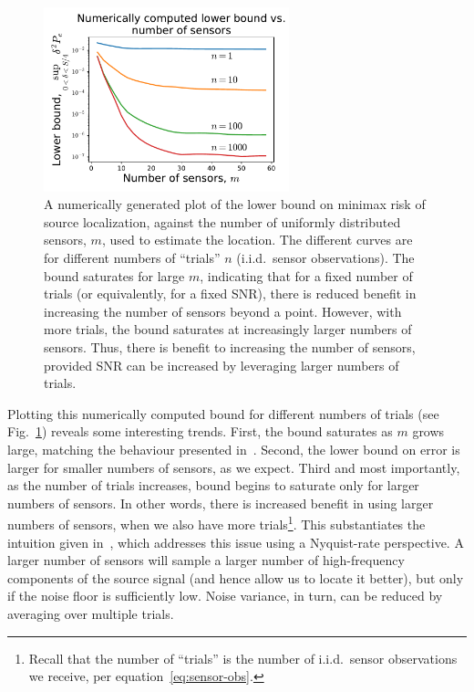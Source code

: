 \documentclass[conference]{IEEEtran}
\begin{document}
\begin{figure}[t]
	\centering
	\includegraphics[width=2.8in]{lb-vs-m-annotated}
	\caption{A numerically generated plot of the lower bound on minimax risk of
		source localization, against the number of uniformly distributed
		sensors, $m$, used to estimate the location. The different curves are
		for different numbers of ``trials'' $n$ (i.i.d.\ sensor observations).
		The bound saturates for large $m$, indicating that for a fixed number
		of trials (or equivalently, for a fixed SNR), there is reduced benefit
		in increasing the number of sensors beyond a point. However, with more
		trials, the bound saturates at increasingly larger numbers of sensors.
	Thus, there is benefit to increasing the number of sensors, provided SNR
can be increased by leveraging larger numbers of trials.}
	\label{fig:numerical}
\end{figure}

Plotting this numerically computed bound for different numbers of trials (see
Fig.~\ref{fig:numerical}) reveals some interesting trends. First, the bound
saturates as $m$ grows large, matching the behaviour presented
in~\cite{Grover2016Fundamental}. Second, the lower bound on error is larger for
smaller numbers of sensors, as we expect. Third and most importantly, as the
number of trials increases, bound begins to saturate only for larger numbers of
sensors. In other words, there is increased benefit in using larger numbers of
sensors, when we also have more trials\footnote{Recall that the number of
``trials'' is the number of i.i.d.\ sensor observations we receive, per
equation~\ref{eq:sensor-obs}.}. This substantiates the intuition given
in~\cite{Grover2016Information}, which addresses this issue using a
Nyquist-rate perspective. A larger number of sensors will sample a larger
number of high-frequency components of the source signal (and hence allow us to
locate it better), but only if the noise floor is sufficiently low. Noise
variance, in turn, can be reduced by averaging over multiple trials.
\end{document}
